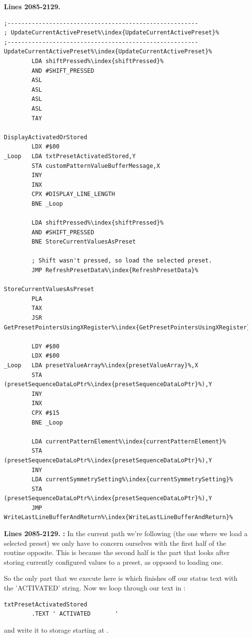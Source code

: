 \clearpage
\textbf{Lines 2085-2129. } 
\begin{lstlisting}[escapechar=\%]
;-------------------------------------------------------
; UpdateCurrentActivePreset%\index{UpdateCurrentActivePreset}%
;-------------------------------------------------------
UpdateCurrentActivePreset%\index{UpdateCurrentActivePreset}%    
        LDA shiftPressed%\index{shiftPressed}%
        AND #SHIFT_PRESSED
        ASL 
        ASL 
        ASL 
        ASL 
        TAY 

DisplayActivatedOrStored
        LDX #$00
_Loop   LDA txtPresetActivatedStored,Y
        STA customPatternValueBufferMessage,X
        INY 
        INX 
        CPX #DISPLAY_LINE_LENGTH
        BNE _Loop

        LDA shiftPressed%\index{shiftPressed}%
        AND #SHIFT_PRESSED
        BNE StoreCurrentValuesAsPreset

        ; Shift wasn't pressed, so load the selected preset.
        JMP RefreshPresetData%\index{RefreshPresetData}%

StoreCurrentValuesAsPreset   
        PLA 
        TAX 
        JSR GetPresetPointersUsingXRegister%\index{GetPresetPointersUsingXRegister}%

        LDY #$00
        LDX #$00
_Loop   LDA presetValueArray%\index{presetValueArray}%,X
        STA (presetSequenceDataLoPtr%\index{presetSequenceDataLoPtr}%),Y
        INY 
        INX 
        CPX #$15
        BNE _Loop

        LDA currentPatternElement%\index{currentPatternElement}%
        STA (presetSequenceDataLoPtr%\index{presetSequenceDataLoPtr}%),Y
        INY 
        LDA currentSymmetrySetting%\index{currentSymmetrySetting}%
        STA (presetSequenceDataLoPtr%\index{presetSequenceDataLoPtr}%),Y
        JMP WriteLastLineBufferAndReturn%\index{WriteLastLineBufferAndReturn}%
\end{lstlisting}
\clearpage

\textbf{Lines 2085-2129. :} In the current path we're following (the one where we load a selected preset)
we only have to concern ourselves with the first half of the routine opposite. This is because the second half is the part that looks after storing
currently configured values to a preset, as opposed to loading one.

So the only part that we execute here is  which finishes off our status text with the 'ACTIVATED' string. Now we loop
through our text in :
\begin{lstlisting}[escapechar=\%]
txtPresetActivatedStored
        .TEXT ' ACTIVATED       '
\end{lstlisting}
and write it to storage starting at . 

